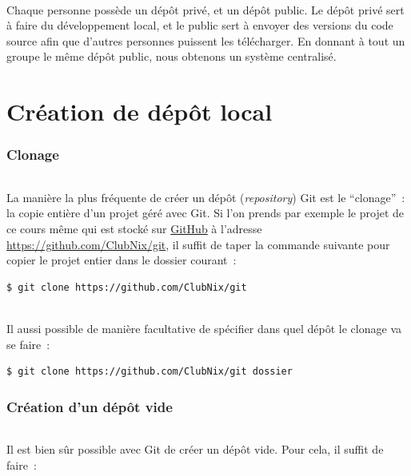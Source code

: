 \documentclass[french, a4paper, 12pt, titlepage]{article}
\begin{document}
\paragraph{} Chaque personne possède un dépôt privé, et un dépôt public.  Le
dépôt privé sert à faire du développement local, et le public sert à envoyer
des versions du code source afin que d'autres personnes puissent les
télécharger.  En donnant à tout un groupe le même dépôt public, nous obtenons
un système centralisé.

\part{Création de dépôt local}

\section{Clonage}

\paragraph{} La manière la plus fréquente de créer un dépôt
(\emph{repository}) Git est le ``clonage''~: la copie entière d'un projet géré
avec Git. Si l'on prends par exemple le projet de ce cours même qui est stocké
sur \href{https://github.com}{GitHub} à l'adresse
\url{https://github.com/ClubNix/git}, il suffit de taper la commande suivante
pour copier le projet entier dans le dossier courant~:

\begin{lstlisting}
$ git clone https://github.com/ClubNix/git
\end{lstlisting}

\paragraph{} Il aussi possible de manière facultative de spécifier dans quel
dépôt le clonage va se faire~:

\begin{lstlisting}
$ git clone https://github.com/ClubNix/git dossier
\end{lstlisting}

\section{Création d'un dépôt vide}

\paragraph{} Il est bien sûr possible avec Git de créer un dépôt vide. Pour
cela, il suffit de faire~:
\end{document}
